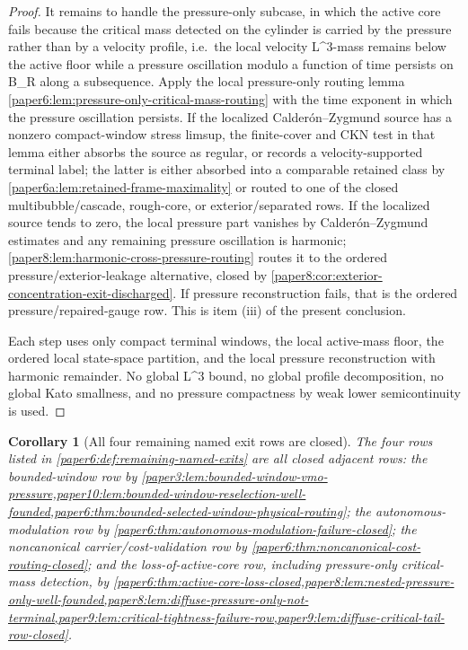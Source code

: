 \documentclass[11pt]{amsart}
\def\({}%
\def\){}%
\theoremstyle{plain}
\newtheorem{corollary}[corollary]{Corollary}
\theoremstyle{definition}
\theoremstyle{remark}
\begin{document}
\begin{proof}
It remains to handle the pressure-only subcase, in which the active core
fails because the critical mass detected on the cylinder is carried by the
pressure rather than by a velocity profile, i.e.\ the local velocity
\(L^3\)-mass remains below the active floor while a pressure oscillation
modulo a function of time persists on \(B_R\) along a subsequence.  Apply the
local pressure-only routing lemma
\cref{paper6:lem:pressure-only-critical-mass-routing} with the time exponent
in which the pressure oscillation persists.  If the localized
Calder\'on--Zygmund source has a nonzero compact-window stress limsup, the
finite-cover and CKN test in that lemma either absorbs the source as regular,
or records a velocity-supported terminal label; the latter is either absorbed
into a comparable retained class by
\cref{paper6a:lem:retained-frame-maximality} or routed to one of the closed
multibubble/cascade, rough-core, or exterior/separated rows.  If the localized
source tends to zero, the local pressure part vanishes by
Calder\'on--Zygmund estimates and any remaining pressure oscillation is harmonic;
\cref{paper8:lem:harmonic-cross-pressure-routing} routes it to the ordered
pressure/exterior-leakage alternative, closed by
\cref{paper8:cor:exterior-concentration-exit-discharged}.  If pressure
reconstruction fails, that is the ordered pressure/repaired-gauge row.  This is
item \textup{(iii)} of the present conclusion.

Each step uses only compact terminal windows, the local active-mass floor,
the ordered local state-space partition, and the local pressure
reconstruction with harmonic remainder.  No global \(L^3\) bound, no global
profile decomposition, no global Kato smallness, and no pressure
compactness by weak lower semicontinuity is used.
\end{proof}

\begin{corollary}[All four remaining named exit rows are closed]
\label{paper6:cor:remaining-named-exits-closed}
The four rows listed in \cref{paper6:def:remaining-named-exits} are all
closed adjacent rows: the bounded-window row by
\cref{paper3:lem:bounded-window-vmo-pressure,paper10:lem:bounded-window-reselection-well-founded,paper6:thm:bounded-selected-window-physical-routing};
the autonomous-modulation row by
\cref{paper6:thm:autonomous-modulation-failure-closed}; the noncanonical
carrier/cost-validation row by
\cref{paper6:thm:noncanonical-cost-routing-closed}; and the loss-of-active-core
row, including pressure-only critical-mass detection, by
\cref{paper6:thm:active-core-loss-closed,paper8:lem:nested-pressure-only-well-founded,paper8:lem:diffuse-pressure-only-not-terminal,paper9:lem:critical-tightness-failure-row,paper9:lem:diffuse-critical-tail-row-closed}.
\end{corollary}
\end{document}
